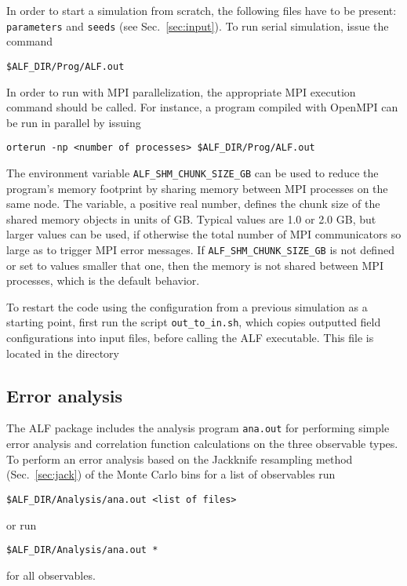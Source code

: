 In order to start a simulation from scratch, the following files have to be present: \texttt{parameters} and \texttt{seeds} (see Sec.~\ref{sec:input}). 
To run serial simulation, issue the command
\begin{lstlisting}[style=bash]
$ALF_DIR/Prog/ALF.out
\end{lstlisting}
In order to run with MPI parallelization, the appropriate MPI execution command should be called. For instance, a program compiled with OpenMPI can be run in parallel by issuing  
\begin{lstlisting}[style=bash]
orterun -np <number of processes> $ALF_DIR/Prog/ALF.out
\end{lstlisting}

\noindent The environment variable \texttt{ALF\_SHM\_CHUNK\_SIZE\_GB} can be used to reduce the program's memory footprint by sharing memory between MPI processes on the same node. The variable, a positive real number, defines the chunk size of the shared memory objects in units of GB.
Typical values are 1.0 or 2.0 GB, but larger values can be used, if otherwise the total number of MPI communicators so large as to trigger MPI error messages.
If \texttt{ALF\_SHM\_CHUNK\_SIZE\_GB} is not defined or set to values smaller that one, then the memory is not shared between MPI processes, which is the default behavior.

To restart the code using the configuration from a previous simulation as a starting point, first run the script \texttt{out\_to\_in.sh}, which copies outputted field configurations into input files, before calling the ALF executable.   This file is located in the  directory 

%
\subsection{Error analysis}\label{sec:analysis}
%

The ALF package includes the analysis program \texttt{ana.out} for performing simple error analysis and correlation function calculations on the three observable types. To perform an error analysis based on the Jackknife resampling method~\cite{efron1981} (Sec.~\ref{sec:jack}) of the Monte Carlo bins for a list of observables run
\begin{lstlisting}[style=bash]
$ALF_DIR/Analysis/ana.out <list of files>
\end{lstlisting}
or run
\begin{lstlisting}[style=bash]
$ALF_DIR/Analysis/ana.out *
\end{lstlisting}
for all observables.

